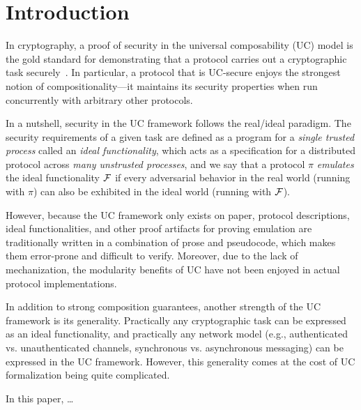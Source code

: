 \section{Introduction}
\label{sec:introduction}

In cryptography, a proof of security in the universal composability (UC) model
is the gold standard for demonstrating that a protocol carries out a
cryptographic task securely~\cite{canetti2001universally}. In particular, a
protocol that is UC-secure enjoys the strongest notion of compositionality---it
maintains its security properties when run concurrently with arbitrary other
protocols.

In a nutshell, security in the UC framework follows the real/ideal paradigm.
The security requirements of a given task are defined as a program for a
\emph{single trusted process} called an \emph{ideal functionality}, which acts
as a specification for a distributed protocol across \emph{many unstrusted
  processes}, and we say that a protocol $\pi$ \emph{emulates} the ideal
functionality $\mathcal{{F}}$ if every adversarial behavior in the real world (running
with $\pi$) can also be exhibited in the ideal world (running with $\mathcal{{F}}$).

However, because the UC framework only exists on paper, protocol descriptions,
ideal functionalities, and other proof artifacts for proving emulation are
traditionally written in a combination of prose and pseudocode, which makes them
error-prone and difficult to verify. Moreover, due to the lack of mechanization,
the modularity benefits of UC have not been enjoyed in actual protocol
implementations.




In addition to strong composition guarantees, another strength of the UC
framework is its generality. Practically any cryptographic task can be expressed
as an ideal functionality, and practically any network model (e.g.,
authenticated vs. unauthenticated channels, synchronous vs. asynchronous
messaging) can be expressed in the UC framework. However, this generality comes
at the cost of UC formalization being quite complicated.

In this paper, \ldots


